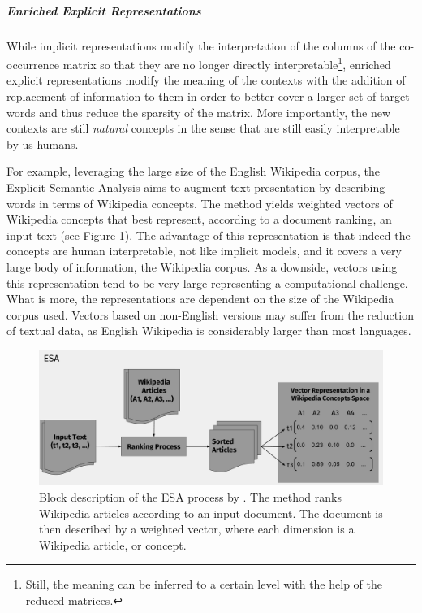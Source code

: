 \subparagraph{Enriched Explicit Representations}
While implicit representations modify the interpretation of the columns of the co-occurrence matrix so that they are no longer directly interpretable\footnote{Still, the meaning can be inferred to a certain level with the help of the reduced matrices.},  enriched explicit representations modify the meaning of the contexts with the addition of replacement of information to them in order to better cover a larger set of target words and thus reduce the sparsity of the matrix. More importantly, the new contexts are still \textit{natural} concepts in the sense that are still easily interpretable by us humans.




For example, leveraging the large size of the English Wikipedia corpus, the Explicit Semantic Analysis \cite{gabrilovich2007computing} aims to augment text presentation by describing words in terms of Wikipedia concepts. The method yields weighted vectors of Wikipedia concepts that best represent, according to a document ranking, an input text (see Figure \ref{fig:esa}).  The advantage of this representation is that indeed the concepts are human interpretable, not like implicit models, and it covers a very large body of information,  the Wikipedia corpus. As a downside, vectors using this representation tend to be very large representing a computational challenge. What is more, the representations are dependent on the size of the Wikipedia corpus used. Vectors based on non-English versions may suffer from the reduction of textual data, as English Wikipedia is considerably larger than most languages.

\begin{figure}
\centering
\includegraphics[width=\linewidth]{images/Chapitre2/esa.pdf}
\caption{Block description of the ESA process by \cite{gabrilovich2007computing}. The method ranks Wikipedia articles according to an input document. The document is then described by a weighted vector, where each dimension is a Wikipedia article, or concept.}
\label{fig:esa}
\end{figure}

